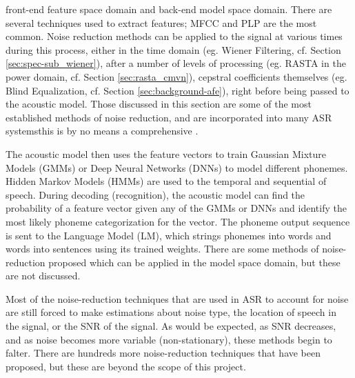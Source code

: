 \DIFdelbegin {}\DIFdelend \DIFaddbegin {}\DIFaddend front-end feature space domain and back-end model space domain.  There are several techniques used to extract features; MFCC and PLP are the most common. Noise reduction methods can be applied to the signal at various times during this process, either in the time domain (eg. Wiener Filtering, cf. Section \ref{sec:spec-sub_wiener}), \DIFdelbegin {}\DIFdelend after a number of levels of processing (eg. RASTA in the power domain, cf. Section \ref{sec:rasta_cmvn}), \DIFdelbegin {}\DIFdelend \DIFaddbegin {}\DIFaddend cepstral coefficients themselves (eg. Blind Equalization, cf. Section \ref{sec:background-afe}), right before being passed to the acoustic model.  Those discussed in this section are some of the most established methods of noise reduction, and are incorporated into many ASR systems\DIFdelbegin {}\DIFdelend \DIFaddbegin {}\DIFaddend this is by no means a comprehensive \DIFdelbegin {}\DIFdelend \DIFaddbegin {}\DIFaddend .  

The acoustic model then uses the feature vectors to train Gaussian Mixture Models (GMMs) or Deep Neural Networks (DNNs) to model different phonemes.  Hidden Markov Models (HMMs) are used to \DIFdelbegin {}\DIFdelend \DIFaddbegin {}\DIFaddend the temporal and sequential \DIFdelbegin {}\DIFdelend \DIFaddbegin {}\DIFaddend of speech. During decoding (recognition), the acoustic model can find the probability of a feature vector given any of the GMMs or DNNs \DIFdelbegin \DIFdel{, }\DIFdelend and identify the most likely phoneme categorization for the vector.  The phoneme output sequence is sent to the Language Model (LM), which strings phonemes into words and words into sentences using its trained weights.  There are some methods of noise-reduction proposed which can be applied in the model space domain, but these are not discussed.

Most of the noise-reduction techniques that are used in ASR to account for noise are still forced to make estimations about noise type, the location of speech in the signal, or the SNR of the signal.  As would be expected, as SNR decreases, and as noise becomes more variable (non-stationary), these methods begin to falter.  There are hundreds more noise-reduction techniques that have been proposed, but these are beyond the scope of this project.

